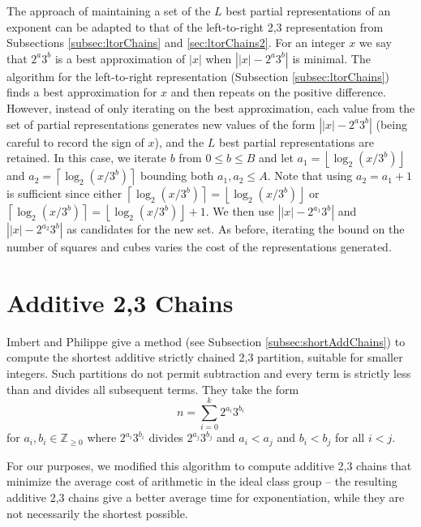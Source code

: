 \documentclass{ucalgthes1}
\theoremstyle{definition}
\newcommand{\ZZgez}{\mathbb{Z}_{\ge 0}}
\newcommand{\floor}[1]{\left\lfloor #1 \right\rfloor}
\newcommand{\ceil}[1]{\left\lceil #1 \right\rceil}
\begin{document}
The approach of maintaining a set of the $L$ best partial representations of an exponent can be adapted to that of the left-to-right 2,3 representation from Subsections \ref{subsec:ltorChains} and \ref{sec:ltorChains2}.  For an integer $x$ we say that $2^a3^b$ is a best approximation of $|x|$ when $\left||x| - 2^a3^b \right|$ is minimal.  The algorithm for the left-to-right representation (Subsection \ref{subsec:ltorChains}) finds a best approximation for $x$ and then repeats on the positive difference. However, instead of only iterating on the best approximation, each value from the set of partial representations generates new values of the form $\left||x| - 2^a3^b\right|$ (being careful to record the sign of $x$), and the $L$ best partial representations are retained.  In this case, we iterate $b$ from $0 \le b \le B$ and let $a_1 = \floor{\log_2 (x/3^b)}$ and $a_2 = \ceil{\log_2 (x/3^b)}$ bounding both $a_1, a_2 \le A$.  Note that using $a_2 = a_1 + 1$ is sufficient since either $\ceil{\log_2 (x/3^b)} = \floor{\log_2 (x/3^b)}$ or $\ceil{\log_2 (x/3^b)} = \floor{\log_2 (x/3^b)} + 1$.  We then use $\left||x|-2^{a_1}3^b\right|$ and $\left||x|-2^{a_2}3^b\right|$ as candidates for the new set.  As before, iterating the bound on the number of squares and cubes varies the cost of the representations generated.  


\section{Additive 2,3 Chains}

Imbert and Philippe \cite{Imbert2010b} give a method (see Subsection \ref{subsec:shortAddChains}) to compute the shortest additive strictly chained 2,3 partition, suitable for smaller integers.  Such partitions do not permit subtraction and every term is strictly less than and divides all subsequent terms. They take the form
\[
	n = \sum_{i=0}^k 2^{a_i}3^{b_i}
\]
for $a_i, b_i \in \ZZgez$ where $2^{a_i}3^{b_i}$ divides $2^{a_j}3^{b_j}$ and $a_i < a_j$ and $b_i < b_j$ for all $i < j$.

For our purposes, we modified this algorithm to compute additive 2,3 chains that minimize the average cost of arithmetic in the ideal class group -- the resulting additive 2,3 chains give a better average time for exponentiation, while they are not necessarily the shortest possible.  
\end{document}
